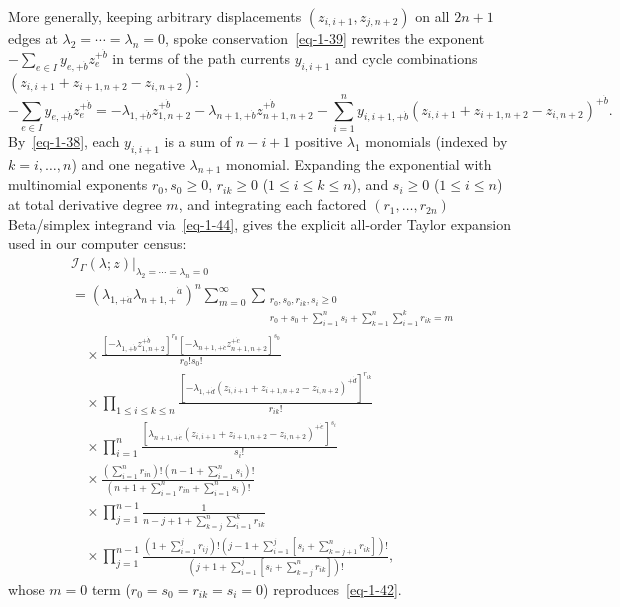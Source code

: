 \documentclass[11pt]{article}
\numberwithin{equation}{section}
\numberwithin{figure}{section}
\numberwithin{table}{section}
\begin{document}
More generally, keeping arbitrary displacements $(z_{i,i+1},z_{j,n+2})$ on all $2n+1$ edges at $\lambda_2=\cdots=\lambda_n=0$, spoke conservation~\eqref{eq-1-39} rewrites the exponent $-\sum_{e\in I}y_{e,+\dot b}z_e^{+\dot b}$ in terms of the path currents $y_{i,i+1}$ and cycle combinations $(z_{i,i+1}+z_{i+1,n+2}-z_{i,n+2})$:
\begin{equation*}
-\sum_{e\in I}y_{e,+\dot b}z_e^{+\dot b}
=-\lambda_{1,+\dot b}z_{1,n+2}^{+\dot b}
-\lambda_{n+1,+\dot b}z_{n+1,n+2}^{+\dot b}
-\sum_{i=1}^n y_{i,i+1,+\dot b}(z_{i,i+1}+z_{i+1,n+2}-z_{i,n+2})^{+\dot b}.
\end{equation*}
By~\eqref{eq-1-38}, each $y_{i,i+1}$ is a sum of $n-i+1$ positive $\lambda_1$ monomials (indexed by $k=i,\ldots,n$) and one negative $\lambda_{n+1}$ monomial. Expanding the exponential with multinomial exponents $r_0,s_0\ge0$, $r_{ik}\ge0$ ($1\le i\le k\le n$), and $s_i\ge0$ ($1\le i\le n$) at total derivative degree $m$, and integrating each factored $(r_1,\ldots,r_{2n})$ Beta/simplex integrand via~\eqref{eq-1-44}, gives the explicit all-order Taylor expansion used in our computer census:
\begin{equation}\label{eq-fan-full-taylor}
\begin{aligned}
&\left.\mathcal I_\Gamma(\lambda;z)
\right|_{\lambda_2=\cdots=\lambda_n=0}\\
&=(\lambda_{1,+\dot a}\lambda_{n+1,+}{}^{\dot a})^n
\sum_{m=0}^{\infty}
\sum_{\substack{r_0,s_0,r_{ik},s_i\ge0\\
r_0+s_0+\sum_{i=1}^ns_i+\sum_{k=1}^n\sum_{i=1}^kr_{ik}=m}}\\
&\quad\times
\frac{[-\lambda_{1,+\dot b}z_{1,n+2}^{+\dot b}]^{r_0}
[-\lambda_{n+1,+\dot c}z_{n+1,n+2}^{+\dot c}]^{s_0}}
{r_0!s_0!}\\
&\quad\times\prod_{1\le i\le k\le n}
\frac{\left[-\lambda_{1,+\dot d}
(z_{i,i+1}+z_{i+1,n+2}-z_{i,n+2})^{+\dot d}\right]^{r_{ik}}}
{r_{ik}!}\\
&\quad\times\prod_{i=1}^n
\frac{\left[\lambda_{n+1,+\dot e}
(z_{i,i+1}+z_{i+1,n+2}-z_{i,n+2})^{+\dot e}\right]^{s_i}}
{s_i!}\\
&\quad\times
\frac{\left(\sum_{i=1}^nr_{in}\right)!
\left(n-1+\sum_{i=1}^ns_i\right)!}
{\left(n+1+\sum_{i=1}^nr_{in}+\sum_{i=1}^ns_i\right)!}\\
&\quad\times\prod_{j=1}^{n-1}
\frac{1}{n-j+1+\sum_{k=j}^{n}\sum_{i=1}^{k}r_{ik}}\\
&\quad\times\prod_{j=1}^{n-1}
\frac{
\left(1+\sum_{i=1}^{j}r_{ij}\right)!
\left(j-1+\sum_{i=1}^{j}\left[s_i+\sum_{k=j+1}^{n}r_{ik}\right]\right)!}
{\left(j+1+\sum_{i=1}^{j}\left[s_i+\sum_{k=j}^{n}r_{ik}\right]\right)!},
\end{aligned}
\end{equation}
whose $m=0$ term ($r_0=s_0=r_{ik}=s_i=0$) reproduces~\eqref{eq-1-42}.
\end{document}
